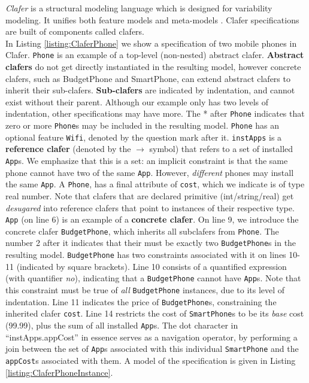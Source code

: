 \documentclass{easychair}
\newcommand{\eg}{\emph{e.g.}\xspace}
\begin{document}
\emph{Clafer} is a structural modeling language which is designed for variability modeling. It unifies both feature models  and meta-models \cite{BakClafer}. Clafer specifications are built of components called clafers. \\
%
\indent In Listing \ref{listing:ClaferPhone}  we show a specification of two mobile phones in Clafer. 
%
 \texttt{Phone} is an example of a top-level (non-nested) abstract clafer. \textbf{Abstract clafers} do not get directly instantiated in the resulting model, however concrete clafers, such as BudgetPhone and SmartPhone, can extend abstract clafers to inherit their sub-clafers. \textbf{Sub-clafers} are indicated by indentation, and cannot exist without their parent. Although our example only has two levels of indentation, other specifications may have more. The * after \texttt{Phone} indicates that zero or more \texttt{Phone}s may be included in the resulting model. \texttt{Phone} has an optional feature \texttt{Wifi}, denoted by the question mark after it. \texttt{instApps} is a \textbf{reference clafer} (denoted by the $\rightarrow$ symbol) that refers  to a set of installed \texttt{App}s. We emphasize that this is a set: an implicit constraint is that the same phone cannot have two of the same \texttt{App}. However, \textit{different} phones may install the same \texttt{App}. A \texttt{Phone}, has a final attribute of \texttt{cost}, which we indicate is of type real number. Note that clafers that are declared primitive (int/string/real) get \textit{desugared} into reference clafers that point to instances of their respective type. \\
%
\indent \texttt{App} (on line 6) is an example of a \textbf{concrete clafer}. On line 9, we introduce the concrete clafer \texttt{BudgetPhone}, which inherits all subclafers from \texttt{Phone}. The number 2 after it indicates that their must be exactly two \texttt{BudgetPhone}s in the resulting model. \texttt{BudgetPhone} has two constraints associated with it on lines 10-11 (indicated by square brackets). Line 10 consists of a quantified expression (with quantifier \textit{no}), indicating that a \texttt{BudgetPhone} cannot have \texttt{App}s. Note that this constraint must be true of \textit{all} \texttt{BudgetPhone} instances, due to its level of indentation. Line 11 indicates the price of \texttt{BudgetPhone}s, constraining the inherited clafer \texttt{cost}. Line 14 restricts the cost of \texttt{SmartPhone}s to be its \textit{base} cost (99.99), plus the sum of all installed \texttt{App}s. The dot character in ``instApps.appCost''  in essence serves as a navigation operator, by performing a join between the set of \texttt{App}s associated with this individual \texttt{SmartPhone} and the \texttt{appCost}s associated with them. A model of the specification is given in Listing \ref{listing:ClaferPhoneInstance}.\\ %
\end{document}
